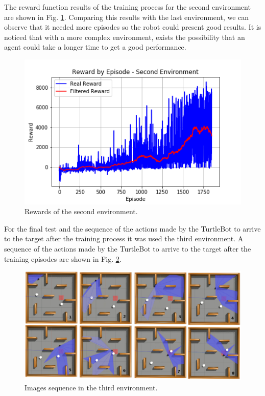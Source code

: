 The reward function results of the training process for the second environment are shown in Fig. \ref{fig:stage_2}.
Comparing this results with the last environment, we can observe that it needed more episodes so the robot could present good results.
It is noticed that with a more complex environment, exists the possibility that an agent could take a longer time to get a good performance.

\begin{figure}[htbp]
\centerline{\includegraphics[width=\columnwidth]{images/stage_2.png}}
\caption{Rewards of the second environment.}
\label{fig:stage_2}
\end{figure}

For the final test and the sequence of the actions made by the TurtleBot to arrive to the target after the training process it was used the third environment.  A sequence of the actions made by the TurtleBot to arrive to the target after the training episodes are shown in Fig. \ref{fig:amb3target}.

\begin{figure}[htbp]
\centerline{\includegraphics[width=\columnwidth]{images/amb3target.png}}
\caption{Images sequence in the third environment.}
\label{fig:amb3target}
\end{figure}

